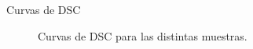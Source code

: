 \documentclass[11pt]{beamer}
\begin{document}
\begin{frame}{Curvas de DSC}
\begin{figure}[H]
{						}
					\caption*{Curvas de DSC para las distintas muestras.}
				\end{figure}	
			\end{frame}
			
\end{document}
